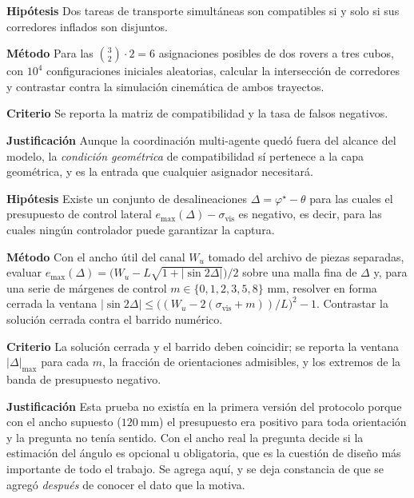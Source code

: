 \documentclass[11pt,a4paper]{article}
\newenvironment{prueba}[2]{%
  \par\medskip\noindent
  \begin{tcolorbox}[enhanced,breakable,colback=white,colframe=black!45,
    boxrule=0.5pt,arc=1pt,left=6pt,right=6pt,top=4pt,bottom=4pt,
    title={\bfseries #1\quad\normalfont #2},
    colbacktitle=black!8,coltitle=black,fonttitle=\bfseries\small]
  \small
}{\end{tcolorbox}\par\medskip}
\newcommand{\campo}[1]{\par\smallskip\noindent\textbf{#1}\quad\ignorespaces}
\begin{document}
\begin{prueba}{N3.8}{Interferencia entre los corredores de los dos rovers}
\campo{Hipótesis} Dos tareas de transporte simultáneas son compatibles si y solo si sus
corredores inflados son disjuntos.
\campo{Método} Para las $\binom{3}{2}\cdot 2 = 6$ asignaciones posibles de dos rovers a
tres cubos, con $10^4$ configuraciones iniciales aleatorias, calcular la intersección
de corredores y contrastar contra la simulación cinemática de ambos trayectos.
\campo{Criterio} Se reporta la matriz de compatibilidad y la tasa de falsos negativos.
\campo{Justificación} Aunque la coordinación multi-agente quedó fuera del alcance del
modelo, la \emph{condición geométrica} de compatibilidad sí pertenece a la capa
geométrica, y es la entrada que cualquier asignador necesitará.
\end{prueba}

\begin{prueba}{N3.10}{Ventana angular admisible: cuándo el ángulo del cubo es obligatorio}
\campo{Hipótesis} Existe un conjunto de desalineaciones $\Delta = \varphi^\star - \theta$
para las cuales el presupuesto de control lateral $e_{\max}(\Delta) - \sigma_{\mathrm{vis}}$
es negativo, es decir, para las cuales ningún controlador puede garantizar la captura.
\campo{Método} Con el ancho útil del canal $W_u$ tomado del archivo de piezas separadas,
evaluar $e_{\max}(\Delta) = \big(W_u - L\sqrt{1+|\sin 2\Delta|}\big)/2$ sobre una malla
fina de $\Delta$ y, para una serie de márgenes de control $m \in \{0,1,2,3,5,8\}$ mm,
resolver en forma cerrada la ventana
$|\sin 2\Delta| \le \big((W_u - 2(\sigma_{\mathrm{vis}}+m))/L\big)^2 - 1$. Contrastar la
solución cerrada contra el barrido numérico.
\campo{Criterio} La solución cerrada y el barrido deben coincidir; se reporta la ventana
$|\Delta|_{\max}$ para cada $m$, la fracción de orientaciones admisibles, y los extremos
de la banda de presupuesto negativo.
\campo{Justificación} Esta prueba no existía en la primera versión del protocolo porque
con el ancho supuesto ($120\ \mathrm{mm}$) el presupuesto era positivo para toda
orientación y la pregunta no tenía sentido. Con el ancho real la pregunta decide si la
estimación del ángulo es opcional u obligatoria, que es la cuestión de diseño más
importante de todo el trabajo. Se agrega aquí, y se deja constancia de que se agregó
\emph{después} de conocer el dato que la motiva.
\end{prueba}
\end{document}
